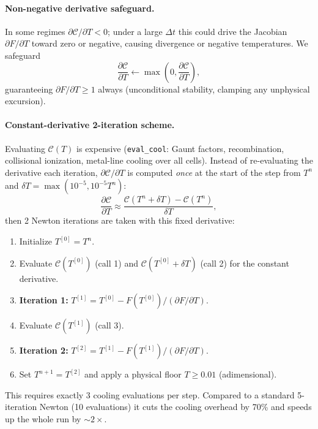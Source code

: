 \documentclass[english,a4paper]{kiseon_memo}
\begin{document}
\paragraph{Non-negative derivative safeguard.} In some regimes
$\partial \mathcal{C}/\partial T < 0$; under a large $\Delta t$ this could drive the
Jacobian $\partial F/\partial T$ toward zero or negative, causing divergence or
negative temperatures. We safeguard
\begin{equation}
  \frac{\partial \mathcal{C}}{\partial T} \leftarrow \max\!\left(0, \frac{\partial \mathcal{C}}{\partial T}\right),
\end{equation}
guaranteeing $\partial F/\partial T \ge 1$ always (unconditional stability,
clamping any unphysical excursion).

\paragraph{Constant-derivative 2-iteration scheme.} Evaluating $\mathcal{C}(T)$ is
expensive (\texttt{eval\_cool}: Gaunt factors, recombination, collisional
ionization, metal-line cooling over all cells). Instead of re-evaluating the
derivative each iteration, $\partial \mathcal{C}/\partial T$ is computed \emph{once}
at the start of the step from $T^n$ and $\delta T = \max(10^{-5}, 10^{-5} T^n)$:
\begin{equation}
  \frac{\partial \mathcal{C}}{\partial T} \approx \frac{\mathcal{C}(T^n + \delta T) - \mathcal{C}(T^n)}{\delta T},
\end{equation}
then 2 Newton iterations are taken with this fixed derivative:
\begin{enumerate}
  \item Initialize $T^{[0]} = T^n$.
  \item Evaluate $\mathcal{C}(T^{[0]})$ (call 1) and $\mathcal{C}(T^{[0]}+\delta T)$
    (call 2) for the constant derivative.
  \item \textbf{Iteration 1:} $T^{[1]} = T^{[0]} - F(T^{[0]})/(\partial F/\partial T)$.
  \item Evaluate $\mathcal{C}(T^{[1]})$ (call 3).
  \item \textbf{Iteration 2:} $T^{[2]} = T^{[1]} - F(T^{[1]})/(\partial F/\partial T)$.
  \item Set $T^{n+1}=T^{[2]}$ and apply a physical floor $T \ge 0.01$ (adimensional).
\end{enumerate}
This requires exactly 3 cooling evaluations per step. Compared to a standard
5-iteration Newton (10 evaluations) it cuts the cooling overhead by 70\% and speeds
up the whole run by $\sim2\times$.
\end{document}
